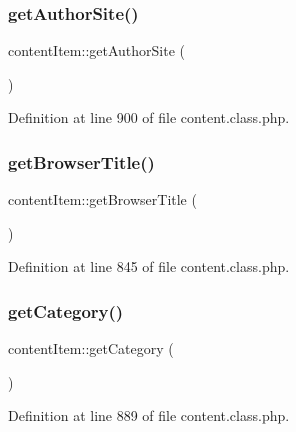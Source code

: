 \hypertarget{classcontentItem_ac8050edaeafe9d6a9c3017185a60576d}{}\label{classcontentItem_ac8050edaeafe9d6a9c3017185a60576d} 
\subsubsection{\texorpdfstring{get\+Author\+Site()}{getAuthorSite()}}
{\footnotesize\ttfamily content\+Item\+::get\+Author\+Site (\begin{DoxyParamCaption}{ }\end{DoxyParamCaption})}



Definition at line 900 of file content.\+class.\+php.

\hypertarget{classcontentItem_a1590559deb019ba22a637cf78408f242}{}\label{classcontentItem_a1590559deb019ba22a637cf78408f242} 
\subsubsection{\texorpdfstring{get\+Browser\+Title()}{getBrowserTitle()}}
{\footnotesize\ttfamily content\+Item\+::get\+Browser\+Title (\begin{DoxyParamCaption}{ }\end{DoxyParamCaption})}



Definition at line 845 of file content.\+class.\+php.

\hypertarget{classcontentItem_ae5a4e97f8f472805fff31340bc095ff3}{}\label{classcontentItem_ae5a4e97f8f472805fff31340bc095ff3} 
\subsubsection{\texorpdfstring{get\+Category()}{getCategory()}}
{\footnotesize\ttfamily content\+Item\+::get\+Category (\begin{DoxyParamCaption}{ }\end{DoxyParamCaption})}



Definition at line 889 of file content.\+class.\+php.

